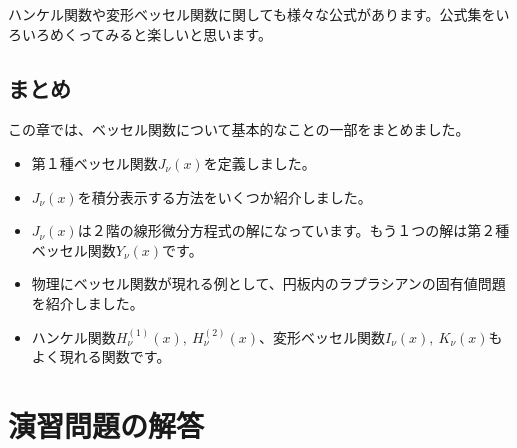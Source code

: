 \documentclass[report,paper=a4, fontsize=12pt, line_length=16cm, number_of_lines=33,dvipdfmx]{jlreq}
\numberwithin{equation}{section}
\begin{document}
ハンケル関数や変形ベッセル関数に関しても様々な公式があります。公式集をいろいろめくってみると楽しいと思います。

\section{まとめ}
この章では、ベッセル関数について基本的なことの一部をまとめました。
\begin{itemize}
  \item 第１種ベッセル関数$J_{\nu}(x)$を定義しました。
  \item $J_{\nu}(x)$を積分表示する方法をいくつか紹介しました。
  \item $J_{\nu}(x)$は２階の線形微分方程式の解になっています。もう１つの解は第２種ベッセル関数$Y_{\nu}(x)$です。
  \item 物理にベッセル関数が現れる例として、円板内のラプラシアンの固有値問題を紹介しました。
  \item ハンケル関数$H^{(1)}_{\nu}(x),\ H^{(2)}_{\nu}(x)$、変形ベッセル関数$I_{\nu}(x),\ K_{\nu}(x)$もよく現れる関数です。
\end{itemize}

\appendix
\chapter{演習問題の解答}
\end{document}
